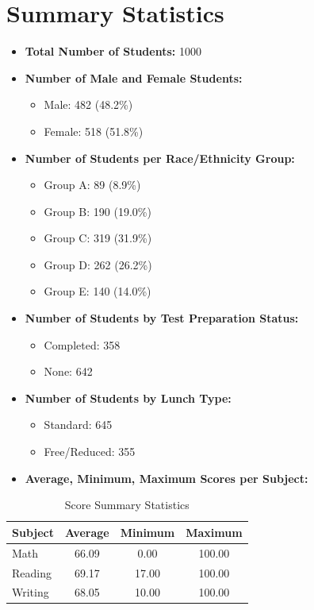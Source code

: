 \documentclass[12pt]{article}
\begin{document}
\section{Summary Statistics}
\begin{itemize}[leftmargin=1.5em]
    \item \textbf{Total Number of Students:} 1000
    \item \textbf{Number of Male and Female Students:}
    \begin{itemize}
        \item Male: 482 (48.2\%)
        \item Female: 518 (51.8\%)
    \end{itemize}
    \item \textbf{Number of Students per Race/Ethnicity Group:}
    \begin{itemize}
        \item Group A: 89 (8.9\%)
        \item Group B: 190 (19.0\%)
        \item Group C: 319 (31.9\%)
        \item Group D: 262 (26.2\%)
        \item Group E: 140 (14.0\%)
    \end{itemize}
    \item \textbf{Number of Students by Test Preparation Status:}
    \begin{itemize}
        \item Completed: 358
        \item None: 642
    \end{itemize}
    \item \textbf{Number of Students by Lunch Type:}
    \begin{itemize}
        \item Standard: 645
        \item Free/Reduced: 355
    \end{itemize}
    \item \textbf{Average, Minimum, Maximum Scores per Subject:}
\end{itemize}

\begin{table}[H]
\centering
\caption{Score Summary Statistics}
\begin{tabular}{lccc}
\toprule
\textbf{Subject} & \textbf{Average} & \textbf{Minimum} & \textbf{Maximum} \\
\midrule
Math    & 66.09 & 0.00 & 100.00 \\
Reading & 69.17 & 17.00 & 100.00 \\
Writing & 68.05 & 10.00 & 100.00 \\
\bottomrule
\end{tabular}
\end{table}
\end{document}
